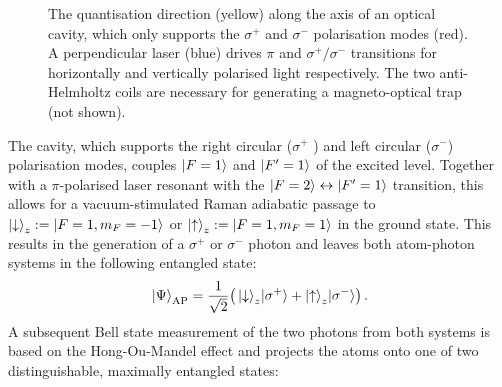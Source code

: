 \documentclass[../Thesis-IJspeert.tex]{subfiles}
\begin{document}
\begin{figure}[t]
	\centering
	\caption[An example of a floating figure]{The quantisation direction (yellow) along the axis of an optical cavity, which only supports the $\sigma^+$ and $\sigma^-$ polarisation modes (red). A perpendicular laser (blue) drives $\pi$ and $\sigma^+/\sigma^-$ transitions for horizontally and vertically polarised light respectively. The two anti-Helmholtz coils are necessary for generating a magneto-optical trap (not shown).} %
	\label{fig:cavity} 
\end{figure}
The cavity, which supports the right circular ($\sigma^+$ ) and left circular ($\sigma^-$) polarisation modes, couples $\ket{F=1}$ and $\ket{F'=1}$ of the  excited level. Together with a $\pi$-polarised laser resonant with the $\ket{F=2}\leftrightarrow \ket{F'=1}$ transition, this allows for a vacuum-stimulated Raman adiabatic passage to $\ket{\downarrow}_z:=\ket{F=1,m_F=-1}$ or $\ket{\uparrow}_z:=\ket{F=1,m_F=1}$ in the ground state. This results in the generation of a $\sigma^+$ or $\sigma^-$ photon and leaves both atom-photon systems in the following entangled state:
\begin{equation}
\color{black} \ket{\Psi}_\text{AP} = \frac{1}{\sqrt{2}} \big( \ket{\downarrow}_z\!\ket{\sigma^+} + \ket{\uparrow}_z\!\ket{\sigma^-} \! \big) \,.
\end{equation}
A subsequent Bell state measurement of the two photons from both systems is based on the Hong-Ou-Mandel effect \cite{HOM} and projects the atoms onto one of two distinguishable, maximally entangled states:
\end{document}
